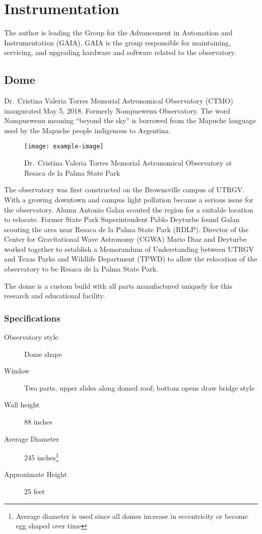 \chapter{Instrumentation}
\label{chp:instrumentation}
The author is leading the Group for the Advancement in Automation and Instrumentation (GAIA).
GAIA is the group responsible for maintaining, servicing, and upgrading hardware and software related to the observatory.

\section{Dome}
Dr.\ Cristina Valeria Torres Memorial Astronomical Observatory (CTMO) inaugurated May 5, 2018. 
Formerly Nompuewenu Observatory.
The word Nompuewenu meaning ``beyond the sky'' is borrowed from the Mapuche language used by the Mapuche people indigenous to Argentina.

\begin{figure}[h]
    \centering
    \texttt{[image: example-image]}
\caption{Dr.\ Cristina Valeria Torres Memorial Astronomical Observatory at Resaca de la Palma State Park}
\label{fig:CTMO}
\end{figure}

The observatory was first constructed on the Brownsville campus of UTRGV\@.
With a growing downtown and campus light pollution became a serious issue for the observatory.
Alumn Antonio Galan scouted the region for a suitable location to relocate.
Former State Park Superintendent Pablo Deyturbe found Galan scouting the area near Resaca de la Palma State Park (RDLP).
Director of the Center for Gravitational Wave Astronomy (CGWA) Mario Diaz and Deyturbe worked together to establish  
a Memorandum of Understanding between UTRGV and Texas Parks and Wildlife Department (TPWD) to allow the relocation
of the observatory to be Resaca de la Palma State Park.

The dome is a custom build with all parts manufactured uniquely for this research and educational facility.

\subsection{Specifications}
\begin{description}
    \item[Observatory style] Dome shape
    \item[Window] Two parts, upper slides along domed roof; bottom opens draw bridge style
    \item[Wall height] 88 inches
    \item[Average Diameter] 245 inches\footnote{Average diameter is used since all domes increase in eccentricity or become egg shaped over time}
    \item[Approximate Height] 25 feet
\end{description}

